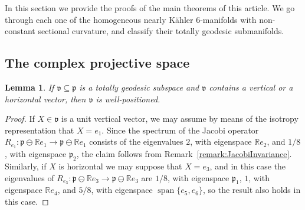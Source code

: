 \documentclass[11pt,a4paper,final]{amsart}
\newcommand{\g}{\mathfrak}
\newcommand{\R}{\mathbb{R}}
\newcommand{\vecspan}{\operatorname{span}}
\newtheorem{lemma}[theorem]{Lemma}
\theoremstyle{definition}
\begin{document}
In this section we provide the proofs of the main theorems of this article.
We go through each one of the homogeneous nearly Kähler $6$-manifolds with non-constant sectional curvature, and classify their totally geodesic submanifolds.

\subsection{The complex projective space}\label{subsec:cp3proof}
	
\begin{lemma}\label{lemma:CP3WellPositioned}
	If $\g{v}\subseteq \g{p}$ is a totally geodesic subspace and $\g{v}$ contains a vertical or a horizontal vector, then $\g{v}$ is well-positioned.
\end{lemma}
\begin{proof}
	If $X\in\g{v}$ is a unit vertical vector, we may assume by means of the isotropy representation that $X=e_{1}$.
	Since the spectrum of the Jacobi operator $R_{e_{1}}\colon \g{p}\ominus \R e_{1}\to \g{p}\ominus \R e_{1}$ consists of the eigenvalues $2$, with eigenspace $\R e_{2}$, and $1/8$, with eigenspace $\g{p}_{2}$, the claim follows from Remark~\ref{remark:JacobiInvariance}.
	Similarly, if $X$ is horizontal we may suppose that $X=e_{3}$, and in this case the eigenvalues of $R_{e_{3}}\colon \g{p}\ominus \R e_{3}\to \g{p}\ominus \R e_{3}$ are $1/8$, with eigenspace $\g{p}_{1}$, $1$, with eigenspace $\R e_{4}$, and $5/8$, with eigenspace $\vecspan\{e_{5},e_{6}\}$, so the result also holds in this case.
	\qedhere 
\end{proof}
	
\end{document}
